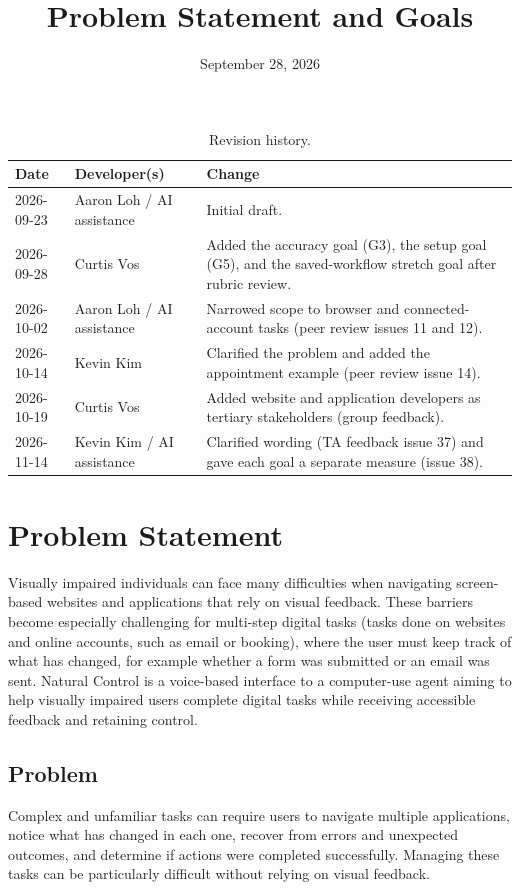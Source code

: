 \documentclass[11pt]{article}
\title{Problem Statement and Goals\\\progname}
\author{\authname}
\date{September 28, 2026}
\begin{document}
\maketitle

\begin{table}[h]
\centering
\caption{Revision history.}\label{tab:ps-revisions}
\begin{tabularx}{\textwidth}{llX}
\toprule
Date & Developer(s) & Change \\
\midrule
2026-09-23 & Aaron Loh / AI assistance & Initial draft. \\
2026-09-28 & Curtis Vos & Added the accuracy goal (G3), the setup goal (G5), and the saved-workflow stretch goal after rubric review. \\
2026-10-02 & Aaron Loh / AI assistance & Narrowed scope to browser and connected-account tasks (peer review issues 11 and 12). \\
2026-10-14 & Kevin Kim & Clarified the problem and added the appointment example (peer review issue 14). \\
2026-10-19 & Curtis Vos & Added website and application developers as tertiary stakeholders (group feedback). \\
2026-11-14 & Kevin Kim / AI assistance & Clarified wording (TA feedback issue 37) and gave each goal a separate measure (issue 38). \\
\bottomrule
\end{tabularx}
\end{table}

\section{Problem Statement}
Visually impaired individuals can face many difficulties when navigating screen-based websites and
applications that rely on visual feedback. These barriers become especially
challenging for multi-step digital tasks (tasks done on websites and online accounts, such as email or
booking), where the user must keep track of what has changed, for example whether a form was submitted
or an email was sent. Natural Control is a voice-based interface to a computer-use agent aiming to help visually impaired users complete
digital tasks while receiving accessible feedback and retaining control.

\subsection{Problem}
Complex and unfamiliar tasks can require users to navigate multiple applications, notice what has changed
in each one, recover from errors and unexpected outcomes, and determine if actions
were completed successfully. Managing these tasks can be particularly difficult without relying on
visual feedback.
\end{document}
